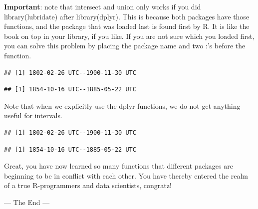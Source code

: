 \documentclass[]{tufte-book}
\begin{document}
\textbf{Important}: note that intersect and union only works if you did library(lubridate) after library(dplyr). This is because both packages have those functions, and the package that was loaded last is found first by R. It is like the book on top in your library, if you like. If you are not sure which you loaded first, you can solve this problem by placing the package name and two :'s before the function.

\begin{verbatim}
## [1] 1802-02-26 UTC--1900-11-30 UTC
\end{verbatim}

\begin{verbatim}
## [1] 1854-10-16 UTC--1885-05-22 UTC
\end{verbatim}

Note that when we explicitly use the dplyr functions, we do not get anything useful for intervals.

\begin{verbatim}
## [1] 1802-02-26 UTC--1900-11-30 UTC
\end{verbatim}

\begin{verbatim}
## [1] 1854-10-16 UTC--1885-05-22 UTC
\end{verbatim}

Great, you have now learned so many functions that different packages are beginning to be in conflict with each other. You have thereby entered the realm of a true R-programmers and data scientists, congratz!

--- The End ---


\end{document}
